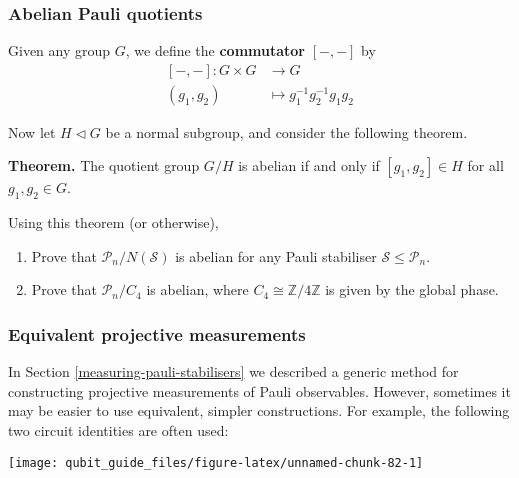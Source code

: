 \documentclass[fleqn]{article}
\providecommand{\tightlist}{%
  \setlength{\itemsep}{0pt}\setlength{\parskip}{0pt}}
\newenvironment{idea}{\noindent}{\medskip}
\begin{document}
\hypertarget{pauli-mod-normaliser-is-abelian}{%
\subsubsection{Abelian Pauli quotients}\label{pauli-mod-normaliser-is-abelian}}

Given any group \(G\), we define the \textbf{commutator} \([-,-]\) by
\[
  \begin{aligned}
    [-,-]\colon G\times G
    &\longrightarrow G
  \\(g_1,g_2)
    &\longmapsto g_1^{-1}g_2^{-1}g_1g_2
  \end{aligned}
\]

Now let \(H\triangleleft G\) be a normal subgroup, and consider the following theorem.

\begin{idea}
\textbf{Theorem.} The quotient group \(G/H\) is abelian if and only if \([g_1,g_2]\in H\) for all \(g_1,g_2\in G\).

\end{idea}

Using this theorem (or otherwise),

\begin{enumerate}
\def\labelenumi{\arabic{enumi}.}
\tightlist
\item
  Prove that \(\mathcal{P}_n/N(\mathcal{S})\) is abelian for any Pauli stabiliser \(\mathcal{S}\leqslant\mathcal{P}_n\).
\item
  Prove that \(\mathcal{P}_n/C_4\) is abelian, where \(C_4\cong\mathbb{Z}/4\mathbb{Z}\) is given by the global phase.
\end{enumerate}

\hypertarget{equivalent-projective-pauli-measurements}{%
\subsubsection{Equivalent projective measurements}\label{equivalent-projective-pauli-measurements}}

In Section \ref{measuring-pauli-stabilisers} we described a generic method for constructing projective measurements of Pauli observables.
However, sometimes it may be easier to use equivalent, simpler constructions.
For example, the following two circuit identities are often used:

\begin{center}\texttt{[image: qubit\_guide\_files/figure-latex/unnamed-chunk-82-1]} \end{center}
\end{document}
